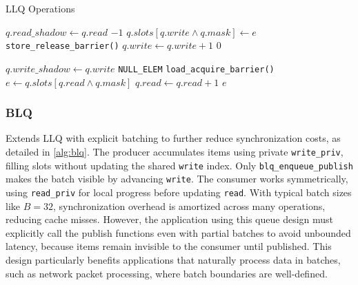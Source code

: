 \begin{algorithm}[!ht]
   \centering
   \captionsetup{justification=centering}
   \caption{\acl{LLQ} Operations \cite{MaffioneCacheAware}}
   \label{alg:llq}
   \scriptsize
   \begin{algorithmic}[1]
            
               \State $q.read\_shadow \gets q.read$ 
                   \State \Return $-1$ 
               \EndIf
           \EndIf
           \State $q.slots[q.write \land q.mask] \gets e$
           \State \texttt{store\_release\_barrier()}
           \State $q.write \gets q.write + 1$
           \State \Return $0$
       \EndFunction
       
       \State
       
            
               \State $q.write\_shadow \gets q.write$ 
                   \State \Return \texttt{NULL\_ELEM}
               \EndIf
           \EndIf
           \State \texttt{load\_acquire\_barrier()}
           \State $e \gets q.slots[q.read \land q.mask]$
           \State $q.read \gets q.read + 1$
           \State \Return $e$
       \EndFunction
   \end{algorithmic}
\end{algorithm}

\subsubsection{\acl{BLQ}}
Extends \ac{LLQ} with explicit batching to further reduce synchronization costs, as detailed in \cref{alg:blq}. The producer accumulates items using private \texttt{write\_priv}, filling slots without updating the shared \texttt{write} index. Only \texttt{blq\_enqueue\_publish} makes the batch visible by advancing \texttt{write}. The consumer works symmetrically, using \texttt{read\_priv} for local progress before updating \texttt{read}. With typical batch sizes like $B = 32$, synchronization overhead is amortized across many operations, reducing cache misses. However, the application using this queue design must explicitly call the publish functions even with partial batches to avoid unbounded latency, because items remain invisible to the consumer until published. This design particularly benefits applications that naturally process data in batches, such as network packet processing, where batch boundaries are well-defined. \cite{MaffioneCacheAware}

